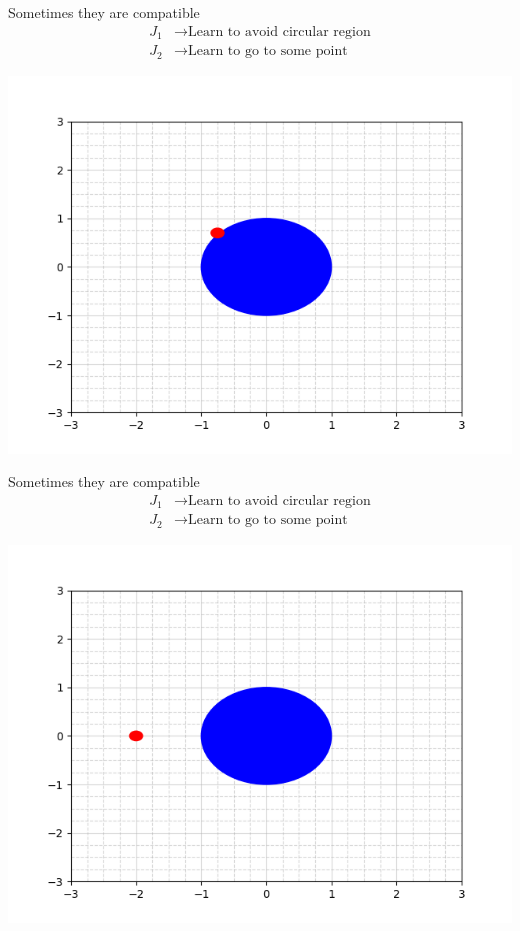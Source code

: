\begin{frame}{Sometimes they are compatible}
	\begin{align*}
		{J}_1 &\rightarrow \textrm{Learn to avoid circular region} \\
		{J}_2 &\rightarrow \textrm{Learn to go to some point}
	\end{align*}
	\begin{minipage}{\textwidth}
		\centering		
		\includegraphics[width=0.5\linewidth]{a1g4}
	\end{minipage}%
\end{frame}

\begin{frame}{Sometimes they are compatible}
	\begin{align*}
		{J}_1 &\rightarrow \textrm{Learn to avoid circular region} \\
		{J}_2 &\rightarrow \textrm{Learn to go to some point}
	\end{align*}
	\begin{minipage}{\textwidth}
		\centering		
		\includegraphics[width=0.5\linewidth]{a1g5}
	\end{minipage}%
\end{frame}


